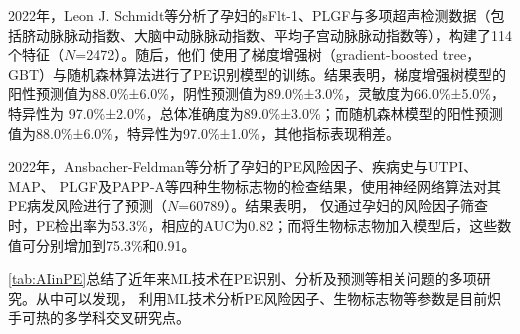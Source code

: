 
2022年，Leon J. Schmidt等\cite{SCHMIDT202277}分析了孕妇的sFlt-1、PLGF与多项超声检测数据（包括脐动脉脉动指数、大脑中动脉脉动指数、平均子宫动脉脉动指数等），构建了114个特征（$N$=2472）。随后，他们
使用了梯度增强树（gradient-boosted tree，GBT）与随机森林算法进行了PE识别模型的训练。结果表明，梯度增强树模型的阳性预测值为88.0\%±6.0\%，阴性预测值为89.0\%±3.0\%，灵敏度为66.0\%±5.0\%，特异性为
97.0\%±2.0\%，总体准确度为89.0\%±3.0\%；而随机森林模型的阳性预测值为88.0\%±6.0\%，特异性为97.0\%±1.0\%，其他指标表现稍差。

2022年，Ansbacher-Feldman等\cite{Ansbacher2022}分析了孕妇的PE风险因子、疾病史与UTPI、MAP、
PLGF及PAPP-A等四种生物标志物的检查结果，使用神经网络算法对其PE病发风险进行了预测（$N$=60789）。结果表明，
仅通过孕妇的风险因子筛查时，PE检出率为53.3\%，相应的AUC为0.82；而将生物标志物加入模型后，这些数值可分别增加到75.3\%和0.91。

\autoref{tab:AIinPE}总结了近年来ML技术在PE识别、分析及预测等相关问题的多项研究。从中可以发现，
利用ML技术分析PE风险因子、生物标志物等参数是目前炽手可热的多学科交叉研究点。

